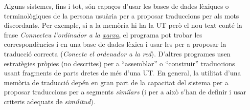 Alguns sistemes, fins i tot, són capaços d'usar les bases de dades
lèxiques o terminològiques de la persona usuària per a proposar
traduccions per als mots discordants.  Per exemple, si a la memòria hi
ha la UT  però el nou text conté la frase
\emph{Connecteu l'ordinador a la \underline{xarxa}}, el programa pot
trobar les correspondències  i  en una base de dades lèxica i usar-les
per a proposar la traducció correcta (\emph{Conecte el ordenador a la
  red}).  D'altres programes usen estratègies pròpies (no descrites)
per a ``assemblar'' o ``construir'' traduccions usant fragments de
parts dretes de més d'una UT.  En general, la utilitat d'una memòria
de traducció depén en gran part de la capacitat del sistema per a
proposar traduccions per a segments {\em similars} (i per a això s'han
de definir i usar criteris adequats de \emph{similitud}).

